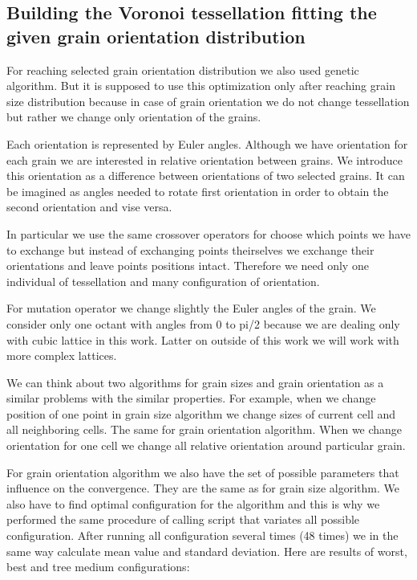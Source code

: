 \documentclass{article}
\begin{document}
\subsection{Building the Voronoi tessellation fitting the given grain orientation distribution}

For reaching selected grain orientation distribution we also used genetic algorithm. But it is supposed to use this optimization only after reaching grain size distribution because in case of grain orientation we do not change tessellation but rather we change only orientation of the grains.

Each orientation is represented by Euler angles. Although we have orientation for each grain we are interested in relative orientation between grains. We introduce this orientation as a difference between orientations of two selected grains. It can be imagined as angles needed to rotate first orientation in order to obtain the second orientation and vise versa.

In particular we use the same crossover operators for choose which points we have to exchange but instead of exchanging points theirselves we exchange their orientations and leave points positions intact. Therefore we need only one individual of tessellation and many configuration of orientation.

For mutation operator we change slightly the Euler angles of the grain. We consider only one octant with angles from 0 to pi/2 because we are dealing only with cubic lattice in this work. Latter on outside of this work we will work with more complex lattices.

We can think about two algorithms for grain sizes and grain orientation as a similar problems with the similar properties. For example, when we change position of one point in grain size algorithm we change sizes of current cell and all neighboring cells. The same for grain orientation algorithm. When we change orientation for one cell we change all relative orientation around particular grain.

For grain orientation algorithm we also have the set of possible parameters that influence on the convergence. They are the same as for grain size algorithm. We also have to find optimal configuration for the algorithm and this is why we performed the same procedure of calling script that variates all possible configuration. After running all configuration several times (48 times) we in the same way calculate mean value and standard deviation. Here are results of worst, best and tree medium configurations:
\end{document}
